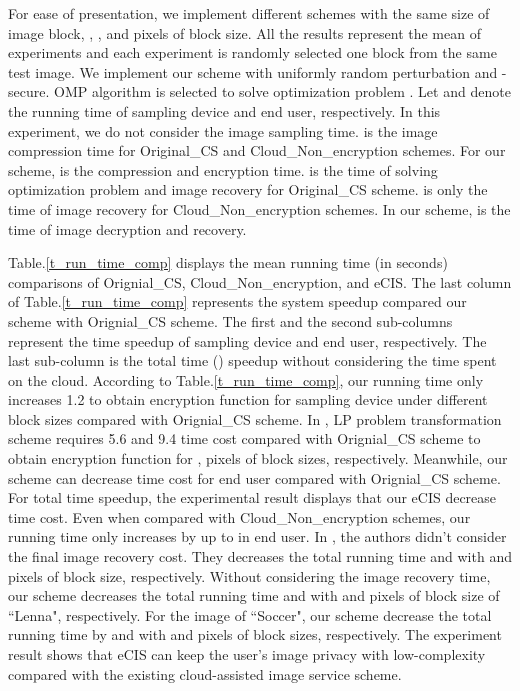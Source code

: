 \documentclass[conference]{IEEEtran}
\begin{document}
For ease of presentation, we implement different schemes with the same size of image block, , , and  pixels of block size. All the results represent the mean of  experiments and each experiment is randomly selected one block from the same test image. We implement our scheme with uniformly random perturbation and -secure. OMP algorithm is selected to solve  optimization problem \cite{OMP}. Let  and  denote the running time of sampling device and  end user, respectively. In this experiment, we do not consider the image sampling time.  is the image compression time for Original\_CS and Cloud\_Non\_encryption schemes. For our scheme,  is the compression and encryption time.  is the time of solving  optimization problem and image recovery for Original\_CS scheme.  is only the time of image recovery for Cloud\_Non\_encryption schemes.  In our scheme,  is the time of image decryption and recovery.

Table.\ref{t_run_time_comp} displays the mean running time (in seconds) comparisons of Orignial\_CS, Cloud\_Non\_encryption, and eCIS. The last column of Table.\ref{t_run_time_comp} represents the system speedup compared our scheme with Orignial\_CS scheme. The first and the second sub-columns represent the time speedup of sampling device and end user, respectively. The last sub-column is the total time () speedup without considering the time spent on the  cloud. According to Table.\ref{t_run_time_comp}, our running time  only increases  1.2  to obtain encryption function for sampling device under different block sizes compared with Orignial\_CS scheme.  In \cite{wang2014privacy}, LP problem transformation scheme requires 5.6 and 9.4 time cost compared with Orignial\_CS scheme to obtain encryption function for ,  pixels of block sizes, respectively. Meanwhile, our scheme can decrease  time cost for end user compared with Orignial\_CS scheme. For total time speedup, the experimental result displays that our eCIS  decrease  time cost.  Even when compared  with Cloud\_Non\_encryption schemes, our running time only increases by up to  in end user. In \cite{wang2014privacy}, the authors didn't consider the final image recovery cost. They decreases the total running time  and  with  and  pixels of block size, respectively. Without considering  the image recovery time, our scheme decreases the total running time  and  with  and  pixels of block size of ``Lenna", respectively. For the image of ``Soccer", our scheme decrease the total running time by  and  with  and  pixels of block sizes, respectively. The experiment result shows that eCIS can keep the user's image privacy with low-complexity  compared with the existing cloud-assisted image service scheme.
\end{document}
